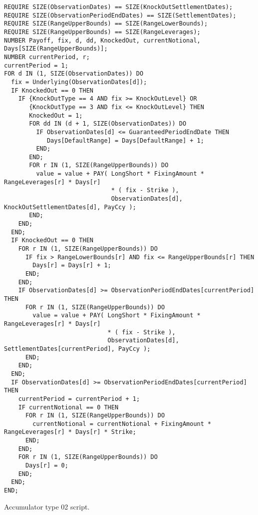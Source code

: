\begin{listing}[H]
\begin{verbatim}
REQUIRE SIZE(ObservationDates) == SIZE(KnockOutSettlementDates);
REQUIRE SIZE(ObservationPeriodEndDates) == SIZE(SettlementDates);
REQUIRE SIZE(RangeUpperBounds) == SIZE(RangeLowerBounds);
REQUIRE SIZE(RangeUpperBounds) == SIZE(RangeLeverages);
NUMBER Payoff, fix, d, dd, KnockedOut, currentNotional, Days[SIZE(RangeUpperBounds)];
NUMBER currentPeriod, r;
currentPeriod = 1;
FOR d IN (1, SIZE(ObservationDates)) DO
  fix = Underlying(ObservationDates[d]);
  IF KnockedOut == 0 THEN
    IF {KnockOutType == 4 AND fix >= KnockOutLevel} OR
       {KnockOutType == 3 AND fix <= KnockOutLevel} THEN
       KnockedOut = 1;
       FOR dd IN (d + 1, SIZE(ObservationDates)) DO
         IF ObservationDates[d] <= GuaranteedPeriodEndDate THEN
            Days[DefaultRange] = Days[DefaultRange] + 1;
         END;
       END;
       FOR r IN (1, SIZE(RangeUpperBounds)) DO
         value = value + PAY( LongShort * FixingAmount * RangeLeverages[r] * Days[r]
                              * ( fix - Strike ),
                              ObservationDates[d], KnockOutSettlementDates[d], PayCcy );
       END;
    END;
  END;
  IF KnockedOut == 0 THEN
    FOR r IN (1, SIZE(RangeUpperBounds)) DO
      IF fix > RangeLowerBounds[r] AND fix <= RangeUpperBounds[r] THEN
        Days[r] = Days[r] + 1;
      END;
    END;
    IF ObservationDates[d] >= ObservationPeriodEndDates[currentPeriod] THEN
      FOR r IN (1, SIZE(RangeUpperBounds)) DO
        value = value + PAY( LongShort * FixingAmount * RangeLeverages[r] * Days[r]
                             * ( fix - Strike ),
                             ObservationDates[d], SettlementDates[currentPeriod], PayCcy );
      END;
    END;
  END;
  IF ObservationDates[d] >= ObservationPeriodEndDates[currentPeriod] THEN
    currentPeriod = currentPeriod + 1;
    IF currentNotional == 0 THEN
      FOR r IN (1, SIZE(RangeUpperBounds)) DO
        currentNotional = currentNotional + FixingAmount * RangeLeverages[r] * Days[r] * Strike;
      END;
    END;
    FOR r IN (1, SIZE(RangeUpperBounds)) DO
      Days[r] = 0;
    END;
  END;
END;
\end{verbatim}
\caption{Accumulator type 02 script.}
\label{lst:accumulator02_script}
\end{listing}
